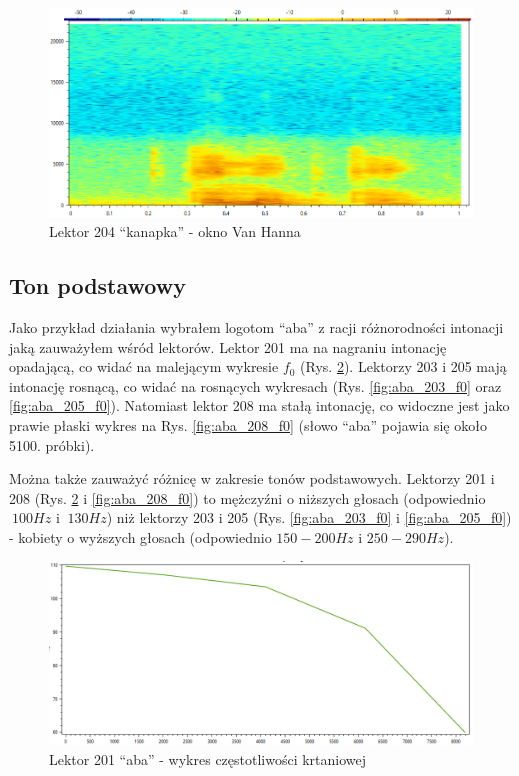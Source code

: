 \documentclass[12pt,a4paper]{article}
\begin{document}
        \begin{figure}
            \centering
            \includegraphics[width=1.0\textwidth]{figures/204_kanapka_vanhann.png}
            \caption{Lektor 204 ``kanapka'' - okno Van Hanna}
            \label{fig:204_kanapka_vanhann}
        \end{figure}


    \subsection{Ton podstawowy }
        Jako przykład działania wybrałem logotom ``aba'' z racji różnorodności intonacji jaką zauważyłem wśród lektorów. Lektor 201 ma na nagraniu intonację opadającą, co widać na malejącym wykresie $f_0$ (Rys. \ref{fig:aba_201_f0}). Lektorzy 203 i 205 mają intonację rosnącą, co widać na rosnących wykresach (Rys. \ref{fig:aba_203_f0} oraz \ref{fig:aba_205_f0}). Natomiast lektor 208 ma stałą intonację, co widoczne jest jako prawie płaski wykres na Rys. \ref{fig:aba_208_f0} (słowo ``aba'' pojawia się około 5100. próbki).

        Można także zauważyć różnicę w zakresie tonów podstawowych. Lektorzy 201 i 208 (Rys. \ref{fig:aba_201_f0} i \ref{fig:aba_208_f0}) to mężczyźni o niższych głosach (odpowiednio $~100Hz$ i $~130Hz$) niż lektorzy 203 i 205 (Rys. \ref{fig:aba_203_f0} i \ref{fig:aba_205_f0}) - kobiety o wyższych głosach (odpowiednio $150-200Hz$ i $250-290Hz$).


        \begin{figure}[h!]
            \centering
            \includegraphics[width=1.0\textwidth]{figures/aba_201_f0.png}
            \caption{Lektor 201 ``aba'' - wykres częstotliwości krtaniowej}
            \label{fig:aba_201_f0}
        \end{figure}
\end{document}
